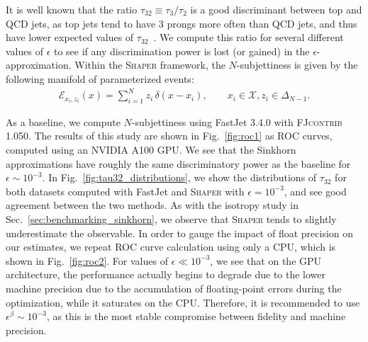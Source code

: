 \documentclass[letterpaper,11pt]{article}
\newcommand{\E}{\mathcal{E}}
\DeclareRobustCommand{\Sec}[1]{Sec.~\ref{sec:#1}}
\DeclareRobustCommand{\Fig}[1]{Fig.~\ref{fig:#1}}
\newcommand{\FastJet}{{\sc FastJet}\xspace}
\newcommand{\Shaper}{\textsc{Shaper}\xspace}
\begin{document}
It is well known that the ratio $\tau_{32} \equiv \tau_3 / \tau_2$ is a good discriminant between top and QCD jets, as top jets tend to have 3 prongs more often than QCD jets, and thus have lower expected values of $\tau_{32}$~\cite{Thaler:2010tr}. We compute this ratio for several different values of $\epsilon$ to see if any discrimination power is lost (or gained) in the $\epsilon$-approximation. Within the \Shaper framework, the $N$-subjettiness is given by the following manifold of parameterized events:
%
\begin{align}
\label{eq:nsubjettiness}
    \E_{x_i, z_i}(x) = \sum_{i=1}^{N} z_i\, \delta(x-x_i), \qquad x_i \in \mathcal{X}, z_i \in \Delta_{N-1}.
\end{align}

As a baseline, we compute $N$-subjettiness using \FastJet 3.4.0 with \textsc{FJcontrib} 1.050.
%
The results of this study are shown in \Fig{roc1} as ROC curves, computed using an NVIDIA A100 GPU. We see that the Sinkhorn approximations have roughly the same discriminatory power as the baseline for $\epsilon \sim 10^{-3}$. In \Fig{tau32_distributions}, we show the distributions of $\tau_{32}$ for both datasets computed with \FastJet and \Shaper with $\epsilon = 10^{-3}$, and see good agreement between the two methods.
%
As with the isotropy study in \Sec{benchmarking_sinkhorn}, we observe that \Shaper tends to slightly underestimate the observable.
%
In order to gauge the impact of float precision on our estimates, we repeat ROC curve calculation using only a CPU, which is shown in \Fig{roc2}. For values of $\epsilon \ll 10^{-3}$, we see that on the GPU architecture, the performance actually begins to degrade due to the lower machine precision due to the accumulation of floating-point errors during the optimization, while it saturates on the CPU. Therefore, it is recommended to use $\epsilon^\beta \sim 10^{-3}$, as this is the most stable compromise between fidelity and machine precision. 



\begin{figure*}[tp]
    \centering
    \caption{
        A ROC curve showing the performance of $\tau_{32} = \tau_3 / \tau_2$ as a discriminator between top (signal) and QCD (background) jets, for several different values of $\epsilon$, as calculated using (a) an NVIDIA A100 and (b) only on CPU. A baseline curve, calculated using the $N$-subjettiness routines in \FastJet 3.4.0, is shown in black.}
    \label{fig:roc_benchmarks}
\end{figure*}
\end{document}
